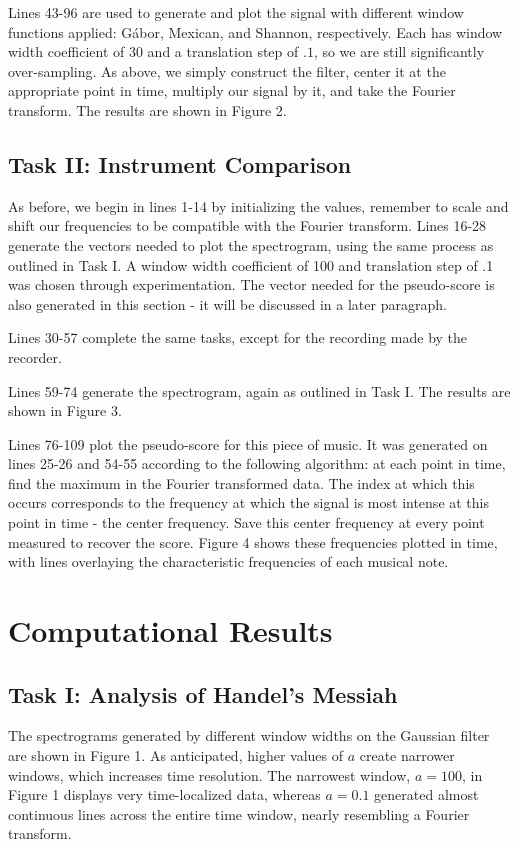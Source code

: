 \documentclass[a4paper,10 pt]{article}
\begin{document}
Lines 43-96 are used to generate and plot the signal with different window functions applied: G\'abor, Mexican, and Shannon, respectively. Each has window width coefficient of $30$ and a translation step of $.1$, so we are still significantly over-sampling. As above, we simply construct the filter, center it at the appropriate point in time, multiply our signal by it, and take the Fourier transform. The results are shown in Figure 2.
\subsection{Task II: Instrument Comparison}
As before, we begin in lines 1-14 by initializing the values, remember to scale and shift our frequencies to be compatible with the Fourier transform. Lines 16-28 generate the vectors needed to plot the spectrogram, using the same process as outlined in Task I. A window width coefficient of 100 and translation step of .1 was chosen through experimentation. The vector needed for the pseudo-score is also generated in this section - it will be discussed in a later paragraph.

Lines 30-57 complete the same tasks, except for the recording made by the recorder.

Lines 59-74 generate the spectrogram, again as outlined in Task I. The results are shown in Figure 3.

Lines 76-109 plot the pseudo-score for this piece of music. It was generated on lines 25-26 and 54-55 according to the following algorithm: at each point in time, find the maximum in the Fourier transformed data. The index at which this occurs corresponds to the frequency at which the signal is most intense at this point in time - the center frequency. Save this center frequency at every point measured to recover the score. Figure 4 shows these frequencies plotted in time, with lines overlaying the characteristic frequencies of each musical note.
\section{Computational Results}
\subsection{Task I: Analysis of Handel's Messiah}
The spectrograms generated by different window widths on the Gaussian filter are shown in Figure 1. As anticipated, higher values of $a$ create narrower windows, which increases time resolution. The narrowest window, $a=100$, in Figure 1 displays very time-localized data, whereas $a=0.1$ generated almost continuous lines across the entire time window, nearly resembling a Fourier transform.
\end{document}
